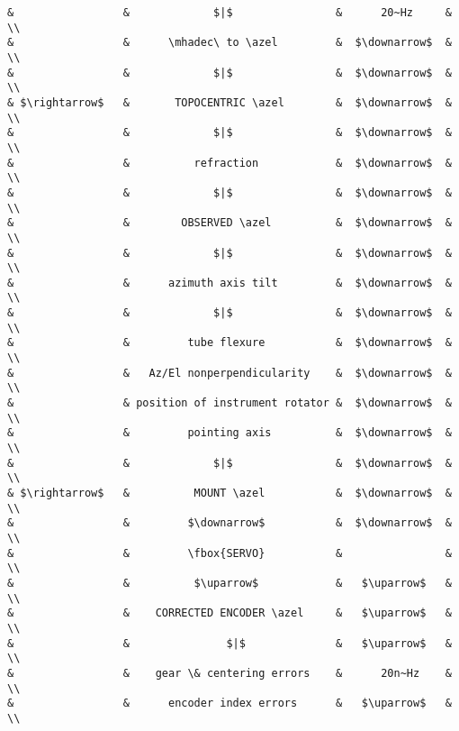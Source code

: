 {\begin{verbatim}
&                 &             $|$                &      20~Hz     & \\
&                 &      \mhadec\ to \azel         &  $\downarrow$  & \\
&                 &             $|$                &  $\downarrow$  & \\
& $\rightarrow$   &       TOPOCENTRIC \azel        &  $\downarrow$  & \\
&                 &             $|$                &  $\downarrow$  & \\
&                 &          refraction            &  $\downarrow$  & \\
&                 &             $|$                &  $\downarrow$  & \\
&                 &        OBSERVED \azel          &  $\downarrow$  & \\
&                 &             $|$                &  $\downarrow$  & \\
&                 &      azimuth axis tilt         &  $\downarrow$  & \\
&                 &             $|$                &  $\downarrow$  & \\
&                 &         tube flexure           &  $\downarrow$  & \\
&                 &   Az/El nonperpendicularity    &  $\downarrow$  & \\
&                 & position of instrument rotator &  $\downarrow$  & \\
&                 &         pointing axis          &  $\downarrow$  & \\
&                 &             $|$                &  $\downarrow$  & \\
& $\rightarrow$   &          MOUNT \azel           &  $\downarrow$  & \\
&                 &         $\downarrow$           &  $\downarrow$  & \\
&                 &         \fbox{SERVO}           &                & \\
&                 &          $\uparrow$            &   $\uparrow$   & \\
&                 &    CORRECTED ENCODER \azel     &   $\uparrow$   & \\
&                 &               $|$              &   $\uparrow$   & \\
&                 &    gear \& centering errors    &      20n~Hz    & \\
&                 &      encoder index errors      &   $\uparrow$   & \\

\end{verbatim}}
